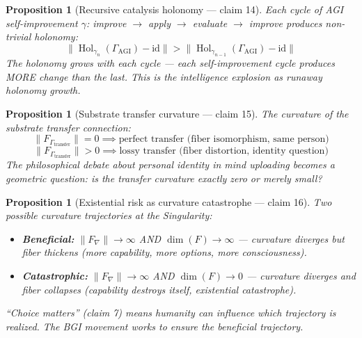 \documentclass[11pt,a4paper]{article}
\newtheorem{proposition}[definition]{Proposition}
\begin{document}
\begin{proposition}[Recursive catalysis holonomy --- claim 14]
\label{prop:holonomy}
Each cycle of AGI self-improvement $\gamma$: improve $\to$ apply $\to$
evaluate $\to$ improve produces non-trivial holonomy:
\[
  \|\operatorname{Hol}_{\gamma_n}(\Gamma_{\text{AGI}}) - \mathrm{id}\| >
  \|\operatorname{Hol}_{\gamma_{n-1}}(\Gamma_{\text{AGI}}) - \mathrm{id}\|
\]
The holonomy grows with each cycle --- each self-improvement cycle
produces MORE change than the last. This is the intelligence explosion
as runaway holonomy growth.
\end{proposition}

\begin{proposition}[Substrate transfer curvature --- claim 15]
\label{prop:transfer}
The curvature of the substrate transfer connection:
\[
  \|F_{\Gamma_{\text{transfer}}}\| = 0 \implies \text{perfect transfer
    (fiber isomorphism, same person)}
\]
\[
  \|F_{\Gamma_{\text{transfer}}}\| > 0 \implies \text{lossy transfer
    (fiber distortion, identity question)}
\]
The philosophical debate about personal identity in mind uploading
becomes a geometric question: is the transfer curvature exactly zero
or merely small?
\end{proposition}

\begin{proposition}[Existential risk as curvature catastrophe --- claim 16]
\label{prop:risk}
Two possible curvature trajectories at the Singularity:
\begin{itemize}
  \item \textbf{Beneficial:}
    $\|F_\nabla\| \to \infty$ AND $\dim(F) \to \infty$ ---
    curvature diverges but fiber thickens (more capability, more
    options, more consciousness).
  \item \textbf{Catastrophic:}
    $\|F_\nabla\| \to \infty$ AND $\dim(F) \to 0$ ---
    curvature diverges and fiber collapses (capability destroys itself,
    existential catastrophe).
\end{itemize}
``Choice matters'' (claim 7) means humanity can influence which
trajectory is realized. The BGI movement works to ensure the
beneficial trajectory.
\end{proposition}
\end{document}

